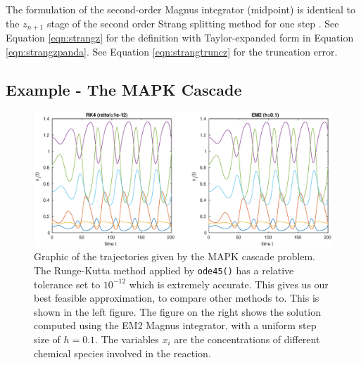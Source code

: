 The formulation of the second-order Magnus integrator (midpoint) is identical to the $z_{n+1}$ stage of the second order Strang splitting method for one step \cite{blanes_pos_2022}.
See Equation \ref{eqn:strangz} for the definition with Taylor-expanded form in Equation \ref{eqn:strangzpanda}.
See Equation \ref{eqn:strangtruncz} for the truncation error.

\subsection{Example - The MAPK Cascade}

\begin{figure}
    \centering
    \includegraphics[width=\linewidth]{Matlab/mapkdual.eps}
    \caption{
        Graphic of the trajectories given by the MAPK cascade problem.
        The Runge-Kutta method applied by \texttt{ode45()} has a relative tolerance set to $10^{-12}$ which is extremely accurate.
        This gives us our best feasible approximation, to compare other methods to.
        This is shown in the left figure.
        The figure on the right shows the solution computed using the EM2 Magnus integrator, with a uniform step size of $h=0.1$.
        The variables $x_i$ are the concentrations of different chemical species involved in the reaction.
    }
    \label{fig:mapkdual}
\end{figure}

